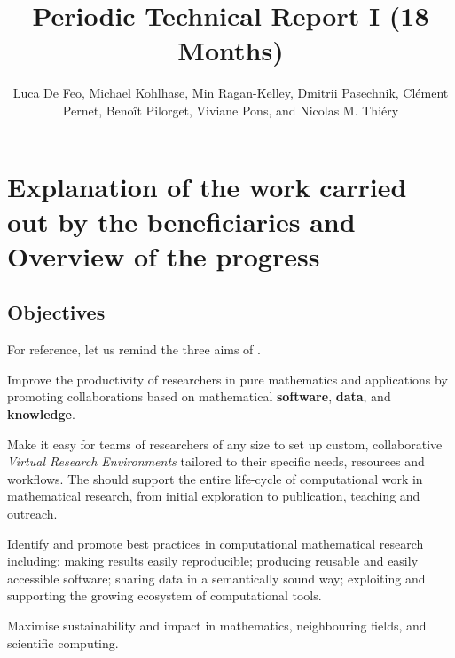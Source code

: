 \documentclass{deliverablereport}
\title{Periodic Technical Report I (18 Months)}
\author{Luca De Feo, Michael Kohlhase, Min Ragan-Kelley, Dmitrii Pasechnik, Clément
  Pernet, Benoît Pilorget, Viviane Pons, and Nicolas M. Thiéry}
\begin{document}
\oldmaketitle
\tableofcontents\newpage

\section{Explanation of the work carried out by the beneficiaries and Overview of the progress}


\subsection{Objectives}

For reference, let us remind the three aims of \ODK.
\begin{compactenum}
\item \label{aim:collaboration} Improve the productivity of
  researchers in pure mathematics and applications by promoting
  collaborations based on mathematical \textbf{software},
  \textbf{data}, and \textbf{knowledge}.
\item \label{aim:vre} Make it easy for teams of researchers of any
  size to set up custom, collaborative \emph{Virtual Research
    Environments} tailored to their specific needs, resources and
  workflows. The \VREs should support the entire life-cycle of
  computational work in mathematical research, from initial
  exploration to publication, teaching and outreach.
\item \label{aim:sharing} Identify and promote best practices in
  computational mathematical research including: making results easily
  reproducible; producing reusable and easily accessible
  software; sharing data in a semantically sound way; exploiting and
  supporting the growing ecosystem of computational tools.
\item \label{aim:impact} Maximise sustainability and impact in
  mathematics, neighbouring fields, and scientific computing.
\end{compactenum}
\end{document}
